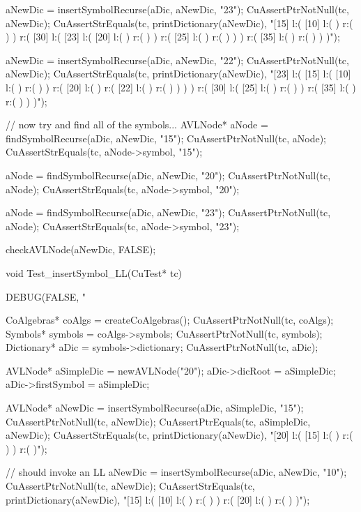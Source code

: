 {  aNewDic = insertSymbolRecurse(aDic, aNewDic, "23");
  CuAssertPtrNotNull(tc, aNewDic);
  CuAssertStrEquals(tc, printDictionary(aNewDic),
  "[15] l:( [10] l:(  ) r:(  )  ) r:( [30] l:( [23] l:( [20] l:(  ) r:(  )  ) r:( [25] l:(  ) r:(  )  )  ) r:( [35] l:(  ) r:(  )  )  )");

  aNewDic = insertSymbolRecurse(aDic, aNewDic, "22");
  CuAssertPtrNotNull(tc, aNewDic);
  CuAssertStrEquals(tc, printDictionary(aNewDic),
  "[23] l:( [15] l:( [10] l:(  ) r:(  )  ) r:( [20] l:(  ) r:( [22] l:(  ) r:(  )  )  )  ) r:( [30] l:( [25] l:(  ) r:(  )  ) r:( [35] l:(  ) r:(  )  )  )");

  // now try and find all of the symbols...
  AVLNode* aNode = findSymbolRecurse(aDic, aNewDic, "15");
  CuAssertPtrNotNull(tc, aNode);
  CuAssertStrEquals(tc, aNode->symbol, "15");

  aNode = findSymbolRecurse(aDic, aNewDic, "20");
  CuAssertPtrNotNull(tc, aNode);
  CuAssertStrEquals(tc, aNode->symbol, "20");

  aNode = findSymbolRecurse(aDic, aNewDic, "23");
  CuAssertPtrNotNull(tc, aNode);
  CuAssertStrEquals(tc, aNode->symbol, "23");

  checkAVLNode(aNewDic, FALSE);
}

void Test_insertSymbol_LL(CuTest* tc) {
  DEBUG(FALSE, "\n%

  CoAlgebras* coAlgs = createCoAlgebras();
  CuAssertPtrNotNull(tc, coAlgs);
  Symbols* symbols = coAlgs->symbols;
  CuAssertPtrNotNull(tc, symbols);
  Dictionary* aDic = symbols->dictionary;
  CuAssertPtrNotNull(tc, aDic);

  AVLNode* aSimpleDic = newAVLNode("20");
  aDic->dicRoot     = aSimpleDic;
  aDic->firstSymbol = aSimpleDic;

  AVLNode* aNewDic = insertSymbolRecurse(aDic, aSimpleDic, "15");
  CuAssertPtrNotNull(tc, aNewDic);
  CuAssertPtrEquals(tc, aSimpleDic, aNewDic);
  CuAssertStrEquals(tc, printDictionary(aNewDic),
  "[20] l:( [15] l:(  ) r:(  )  ) r:(  )");

  // should invoke an LL
  aNewDic = insertSymbolRecurse(aDic, aNewDic, "10");
  CuAssertPtrNotNull(tc, aNewDic);
  CuAssertStrEquals(tc, printDictionary(aNewDic),
  "[15] l:( [10] l:(  ) r:(  )  ) r:( [20] l:(  ) r:(  )  )");
}

